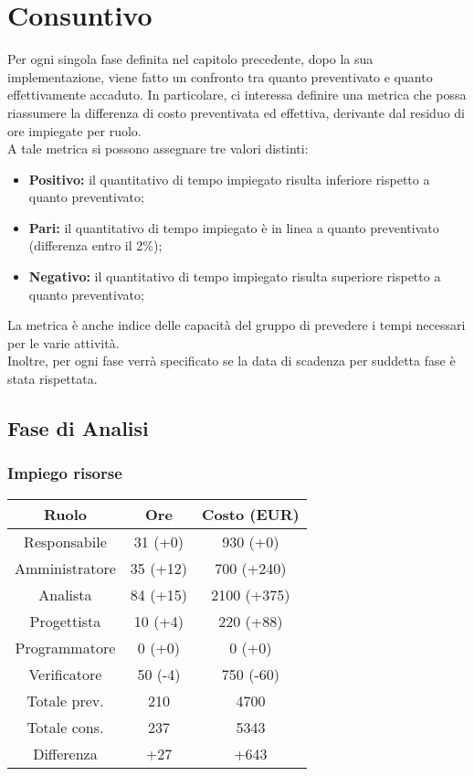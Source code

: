 \section{Consuntivo}

Per ogni singola fase definita nel capitolo precedente, dopo la sua implementazione, viene fatto un confronto tra quanto preventivato e quanto effettivamente accaduto. In particolare, ci interessa definire una metrica che possa riassumere la differenza di costo preventivata ed effettiva, derivante dal residuo di ore impiegate per ruolo. \\ A tale metrica si possono assegnare tre valori distinti:
\begin{itemize}
	\item \textbf{Positivo:} il quantitativo di tempo impiegato risulta inferiore rispetto a quanto preventivato;
	\item \textbf{Pari:} il quantitativo di tempo impiegato è in linea a quanto preventivato (differenza entro il 2\%);
	\item \textbf{Negativo:} il quantitativo di tempo impiegato risulta superiore rispetto a quanto preventivato;
\end{itemize}
La metrica è anche indice delle capacità del gruppo di prevedere i tempi necessari per le varie attività.
\\Inoltre, per ogni fase verrà specificato se la data di scadenza per suddetta fase è stata rispettata.
\subsection{Fase di Analisi}
\subsubsection{Impiego risorse}

\begin{center}
\begin{tabular}{ |c|c|c|  }
 \hline
 Ruolo 		& Ore & Costo (EUR)\\
 \hline\hline
	Responsabile	& 31 (+0) & 930 (+0)\\
	Amministratore	& 35 (+12) & 700 (+240)\\
	Analista		& 84 (+15) & 2100 (+375)\\
	Progettista		& 10 (+4) & 220 (+88)\\
	Programmatore	& 0 (+0) & 0 (+0)\\
	Verificatore	& 50 (-4) & 750 (-60)\\
	\hline\hline
	Totale prev.	& 210 & 4700 \\
	Totale cons.	& 237 & 5343 \\
	Differenza		& +27 & +643 \\
 \hline
\end{tabular}
\end{center}

